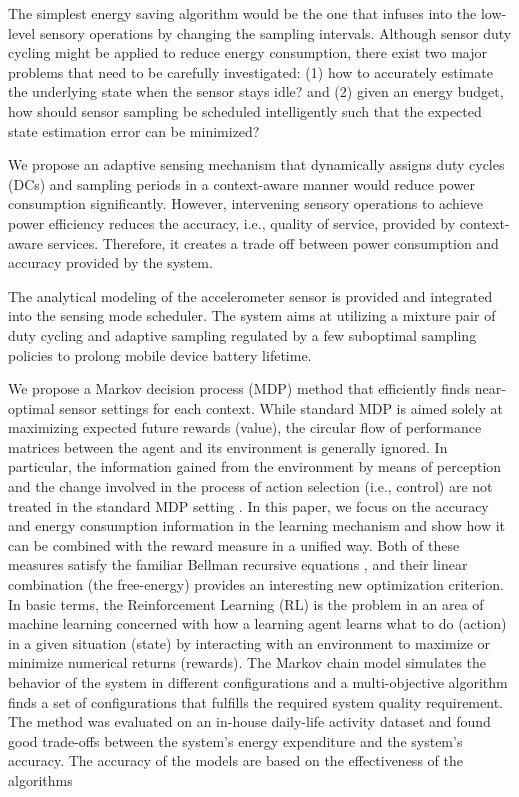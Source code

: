 \documentclass[letterpaper, 10pt, conference]{IEEEtran} %
\begin{document}
The simplest energy saving algorithm would be the one that infuses into the low-level sensory operations by changing the sampling intervals.
Although sensor duty cycling might be applied to reduce energy consumption, there exist two major problems that need to be carefully investigated:
(1) how to accurately estimate the underlying state when
the sensor stays idle? and 
(2) given an energy budget, how should sensor sampling be scheduled intelligently such that the expected state estimation error can be minimized?



We propose an adaptive sensing mechanism that dynamically assigns duty cycles (DCs) and sampling periods in a context-aware manner would reduce power consumption significantly. However, intervening sensory operations to achieve power efficiency reduces the accuracy, i.e., quality of service, provided by context-aware services. Therefore, it creates a trade off between power consumption and accuracy provided by the system.

The analytical modeling of the accelerometer sensor is provided and integrated into the sensing mode scheduler. The system aims at utilizing a mixture pair of duty cycling and adaptive sampling regulated by a few suboptimal sampling policies to prolong mobile device battery lifetime.



We propose a Markov decision process (MDP) method that efficiently finds near-optimal sensor settings for each context. While standard MDP is aimed solely at maximizing expected future rewards (value), the circular flow of performance matrices between the agent and its environment is generally ignored. In particular, the information gained from the environment by means of perception and the change involved in the process of action selection (i.e., control) are not treated in the standard MDP setting \cite{Rubin2012}. In this paper, we focus on the accuracy and energy consumption information in the learning mechanism and show how it can be combined with the reward measure in a unified way. Both of these measures satisfy the familiar Bellman recursive equations \cite{bellman2015} , and their linear combination (the free-energy) provides an interesting new optimization criterion. 
In basic terms, the Reinforcement Learning (RL) is the problem in an area of machine learning concerned with how a learning agent learns what to do (action) in a given situation (state) by interacting with an environment to maximize or minimize numerical returns (rewards).
The Markov chain model simulates the behavior of the system in different configurations and a multi-objective algorithm finds a set of configurations that fulfills the required system quality requirement. The method was evaluated on an in-house daily-life activity dataset and found good trade-offs between the system’s energy expenditure and the system’s accuracy. The accuracy of the models are based on the effectiveness of the algorithms
\end{document}
